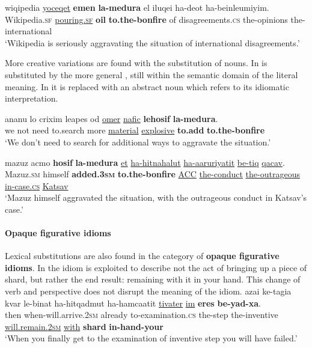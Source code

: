 \documentclass[output=paper]{langsci/langscibook}
\begin{document}
    \ea\label{medura-sub-verb}
        \gll wiqipedia \underline{yoceqet} \textbf{{\shin}emen} \textbf{la-medura} {\shin}el {\het}iluqei ha-de{\ayin}ot ha-beinle{\alef}umiyim.\\
            Wikipedia.\textsc{sf} \underline{pouring.\textsc{sf}} \textbf{oil} \textbf{to.the-bonfire} of disagreements.\textsc{cs} the-opinions the-international\\
        \glt `Wikipedia is seriously aggravating the situation of international disagreements.'
    \z

More creative variations are found with the substitution of nouns. In   is substituted by the more general , still within the semantic domain of the literal meaning. In  it is replaced with an abstract noun which refers to its idiomatic interpretation.

     \ea\label{medura-sub-do-lit}
        \gll {\alef}ana{\het}nu lo crixim le{\het}apes {\ayin}od \underline{{\het}omer} \underline{nafic} \textbf{lehosif} \textbf{la-medura}.\\
            we not need to.search more \underline{material} \underline{explosive} \textbf{to.add} \textbf{to.the-bonfire}\\
        \glt `We don't need to search for additional ways to aggravate the situation.'
    \z

	\ea\label{medura-sub-do-id}
    	\gll mazuz {\ayin}acmo \textbf{hosif} \textbf{la-medura} \underline{{\alef}et} \underline{ha-hitnahalut} \underline{ha-{\shin}a{\ayin}aruriyatit} \underline{be-tiq} \underline{qacav}.\\
    	   Mazuz.\textsc{sm} himself \textbf{added.\textsc{3sm}} \textbf{to.the-bonfire} \underline{ACC} \underline{the-conduct} \underline{the-outrageous} \underline{in-case.\textsc{cs}} \underline{Katsav}\\
    	\glt `Mazuz himself aggravated the situation, with the outrageous conduct in Katsav's case.'
	\z

 \paragraph*{Opaque figurative idioms}

Lexical substitutions are also found in the category of \textbf{opaque figurative idioms}.
In  the idiom is exploited to describe not the act of bringing up a piece of shard, but rather the end result: remaining with it in your hand. This change of verb and perspective does not disrupt the meaning of the idiom.
    \ea\label{xeres-sub}
        \gll {\alef}azai k{\shin}e-tagi{\ayin}a kvar le-b{\het}inat ha-hitqadmut ha-hamca{\alef}atit \underline{tivater} \underline{{\ayin}im} \textbf{{\het}eres} \textbf{be-yad-xa}.\\
            then when-will.arrive.\textsc{2sm} already to-examination.\textsc{cs} the-step the-inventive \underline{will.remain.\textsc{2sm}} \underline{with} \textbf{shard} \textbf{in-hand-your}\\
        \glt `When you finally get to the examination of inventive step you will have failed.'
    \z
\end{document}
